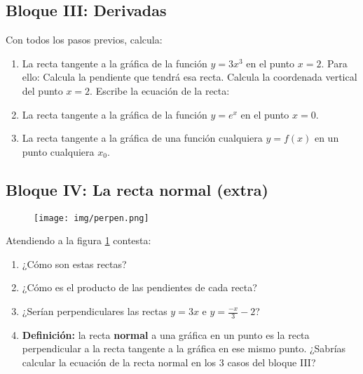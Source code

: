 \documentclass[palatino]{apuntesURJC}
\begin{document}
\subsection{Bloque III: Derivadas}

Con todos los pasos previos, calcula:

\begin{enumerate}
	\item La recta tangente a la gráfica de la función $y=3x^3$ en el punto $x=2$. Para ello:
	\subitem Calcula la pendiente que tendrá esa recta.
	\subitem Calcula la coordenada vertical del punto $x=2$.
	\subitem Escribe la ecuación de la recta:
	\item La recta tangente a la gráfica de la función $y=e^x$ en el punto $x=0$.
	\item La recta tangente a la gráfica de una función cualquiera $y=f(x)$ en un punto cualquiera $x_0$.
\end{enumerate}

\subsection{Bloque IV: La recta normal (extra)}

\begin{figure}[hbtp]
\centering
\texttt{[image: img/perpen.png]}
\caption{}
\label{img:perpen}
\end{figure}


Atendiendo a la figura \ref{img:perpen} contesta:
\begin{enumerate}
	\item ¿Cómo son estas rectas?
	\item ¿Cómo es el producto de las pendientes de cada recta?
	\item ¿Serían perpendiculares las rectas $y=3x$ e $y=\frac{-x}{3}-2$?
	\item \textbf{Definición:} la recta \textbf{normal} a una gráfica en un punto es la recta perpendicular a la recta tangente a la gráfica en ese mismo punto.
	\subitem ¿Sabrías calcular la ecuación de la recta normal en los 3 casos del bloque III?
\end{enumerate}



\printindex
\end{document}
